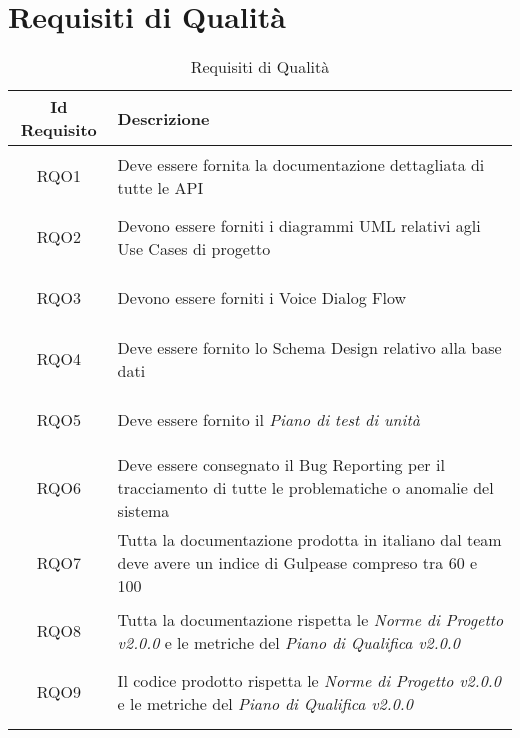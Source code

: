\section{Requisiti di Qualità}
\normalsize
\begin{longtable}{|c|X|}
	\hline
	\textbf{Id Requisito} & \textbf{Descrizione}\\
	\hline
	\endhead
	\hypertarget{RQO1}{RQO1} & Deve essere fornita la documentazione dettagliata di tutte le API\\ \hline
	
	\hypertarget{RQO2}{RQO2} & Devono essere forniti i diagrammi UML relativi agli Use Cases di progetto \\ \hline
	
	\hypertarget{RQO3}{RQO3} & Devono essere forniti i Voice Dialog Flow \\ \hline
	
	\hypertarget{RQO4}{RQO4} & Deve essere fornito lo Schema Design relativo alla base dati \\ \hline
	
	\hypertarget{RQO5}{RQO5} & Deve essere fornito il \textit{Piano di test di unità}\\ \hline
	
	\hypertarget{RQO6}{RQO6} & Deve essere consegnato il Bug Reporting per il tracciamento di tutte le problematiche o anomalie del sistema \\ \hline
	
	\hypertarget{RQO7}{RQO7} & Tutta la documentazione prodotta in italiano dal team deve avere un indice di Gulpease compreso tra 60 e 100  \\ \hline
	
	\hypertarget{RQO8}{RQO8} & Tutta la documentazione rispetta le \textit{Norme di Progetto v2.0.0} e le metriche del \textit{Piano di Qualifica v2.0.0} \\ \hline
	
	\hypertarget{RQO9}{RQO9} & Il codice prodotto rispetta le \textit{Norme di Progetto v2.0.0} e le metriche del \textit{Piano di Qualifica v2.0.0} \\ \hline
	
	\caption[Requisiti di Qualità]{Requisiti di Qualità}
	\label{tabella:req2}
\end{longtable}
\clearpage
